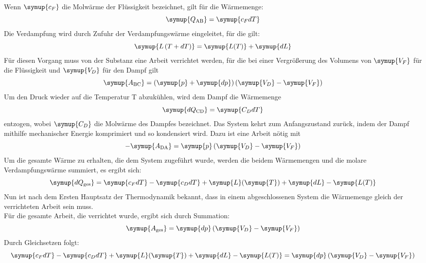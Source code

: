 Wenn $\symup{c_F}$ die Molwärme der Flüssigkeit bezeichnet, gilt für die Wärmemenge:
\begin{equation}
\symup{Q_\text{AB}}  = \symup{c_F dT}
\end{equation}
Die Verdampfung wird durch Zufuhr der Verdampfungswärme eingeleitet, für die gilt:
\begin{equation}
\symup{L \left( T + dT \right)} = \symup{L(T)} + \symup{dL}
\end{equation}
Für diesen Vorgang muss von der Substanz eine Arbeit verrichtet werden, für die bei einer Vergrößerung
des Volumens von $\symup{V_F}$ für die Flüssigkeit und $\symup{V_D}$ für den Dampf gilt
\begin{equation}
\symup{A_\text{BC}} = \left( \symup{p} + \symup{dp} \right) \left( \symup{V_D} - \symup{V_F} \right)
\end{equation}
Um den Druck wieder auf die Temperatur T abzukühlen, wird dem Dampf die Wärmemenge
\begin{equation}
\symup{dQ_\text{CD}} = \symup{C_D dT}
\end{equation}
entzogen, wobei $\symup{C_D}$ die Molwärme des Dampfes bezeichnet. Das System kehrt zum Anfangszustand
zurück, indem der Dampf mithilfe mechanischer Energie komprimiert und so kondensiert wird. Dazu ist 
eine Arbeit nötig mit
\begin{equation}
- \symup{A_{\text{DA}}} = \symup{p} \left( \symup{V_D} - \symup{V_F} \right)
\end{equation}
Um die gesamte Wärme zu erhalten, die dem System zugeführt wurde, werden die beidem Wärmemengen und
die molare Verdampfungswärme summiert, es ergibt sich:
\begin{equation}
\symup{dQ_\text{ges}} = \symup{c_F dT} - \symup{c_D dT} + \symup{L}(\symup{T}) + \symup{dL} - \symup{L(T)}
\end{equation}
Nun ist nach dem Ersten Hauptsatz der Thermodynamik bekannt, dass in einem abgeschlossenen System die Wärmemenge gleich der verrichteten Arbeit 
sein muss.\\
Für die gesamte Arbeit, die verrichtet wurde, ergibt sich durch Summation:
\begin{equation}
\symup{A_\text{ges}} = \symup{dp} \left( \symup{V_D} - \symup{V_F} \right)
\end{equation}
Durch Gleichsetzen folgt:
\begin{equation}
\symup{c_F dT} - \symup{c_D dT} + \symup{L}(\symup{T}) + \symup{dL} - \symup{L(T)} = \symup{dp} \left( \symup{V_D} - \symup{V_F} \right)
\label{eqn:ersterHS}
\end{equation}
